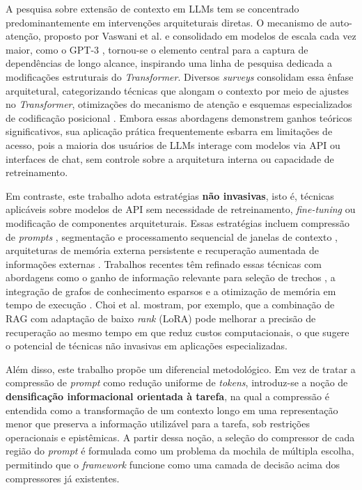 A pesquisa sobre extensão de contexto em LLMs tem se concentrado predominantemente em intervenções arquiteturais diretas. O mecanismo de auto-atenção, proposto por Vaswani et al. \cite{vaswani2017attention} e consolidado em modelos de escala cada vez maior, como o GPT-3 \cite{brown2020fewshot}, tornou-se o elemento central para a captura de dependências de longo alcance, inspirando uma linha de pesquisa dedicada a modificações estruturais do \textit{Transformer}. Diversos \textit{surveys} consolidam essa ênfase arquitetural, categorizando técnicas que alongam o contexto por meio de ajustes no \textit{Transformer}, otimizações do mecanismo de atenção e esquemas especializados de codificação posicional \cite{huang2024longcontext,wang2024beyondlimits,zhao2023survey,naveed2023overview,wan2023efficient,zhuang2023efficienttraining}. Embora essas abordagens demonstrem ganhos teóricos significativos, sua aplicação prática frequentemente esbarra em limitações de acesso, pois a maioria dos usuários de LLMs interage com modelos via API ou interfaces de chat, sem controle sobre a arquitetura interna ou capacidade de retreinamento.

Em contraste, este trabalho adota estratégias \textbf{não invasivas}, isto é, técnicas aplicáveis sobre modelos de API sem necessidade de retreinamento, \textit{fine-tuning} ou modificação de componentes arquiteturais. Essas estratégias incluem compressão de \textit{prompts} \cite{jiang2023llmlingua,gilbert2023semanticcompression}, segmentação e processamento sequencial de janelas de contexto \cite{kamradt2023workaround}, arquiteturas de memória externa persistente \cite{packer2024memgpt,xiao2024infllm} e recuperação aumentada de informações externas \cite{yu2024defenserag,lewis2020rag,sharma2025ragsurvey}. Trabalhos recentes têm refinado essas técnicas com abordagens como o ganho de informação relevante para seleção de trechos \cite{pickett2024rig}, a integração de grafos de conhecimento esparsos \cite{alonso2024mixturepageranks} e a otimização de memória em tempo de execução \cite{kwon2023pagedattention}. Choi et al. \cite{choi2025loraragg} mostram, por exemplo, que a combinação de RAG com adaptação de baixo \textit{rank} (LoRA) pode melhorar a precisão de recuperação ao mesmo tempo em que reduz custos computacionais, o que sugere o potencial de técnicas não invasivas em aplicações especializadas.

Além disso, este trabalho propõe um diferencial metodológico. Em vez de tratar a compressão de \textit{prompt} como redução uniforme de \textit{tokens}, introduz-se a noção de \textbf{densificação informacional orientada à tarefa}, na qual a compressão é entendida como a transformação de um contexto longo em uma representação menor que preserva a informação utilizável para a tarefa, sob restrições operacionais e epistêmicas. A partir dessa noção, a seleção do compressor de cada região do \textit{prompt} é formulada como um problema da mochila de múltipla escolha, permitindo que o \textit{framework} funcione como uma camada de decisão acima dos compressores já existentes.

